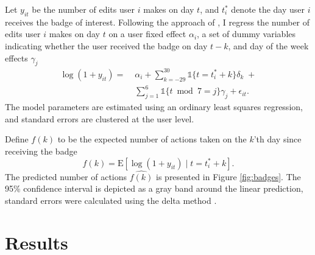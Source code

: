 \documentclass[conference]{IEEEtran}
\newcommand{\1}{\mathds{1}}
\newcommand{\E}{\mathrm{E}}
\begin{document}
Let $y_{it}$ be the number of edits user $i$ makes on day $t$, and $t_i^*$ denote the day user $i$ receives the badge of interest. Following the approach of \citet{Jacobson1993}, I regress the number of edits user $i$ makes on day $t$ on a user fixed effect $\alpha_i$, a set of dummy variables indicating whether the user received the badge on day $t-k$, and day of the week effects $\gamma_j$
\begin{equation}
\begin{split}
\log(1 + y_{it}) = \; & \alpha_i + \sum_{k=-29}^{30} \1 \{ t = t_i^* + k \} \delta_k \; + \\
  & \sum_{j=1}^6 \1 \{ t \bmod 7 = j \} \gamma_j + \epsilon_{it}.
\end{split}
\end{equation}
The model parameters are estimated using an ordinary least squares regression, and standard errors are clustered at the user level.

Define $f(k)$ to be the expected number of actions taken on the $k$'th day since receiving the badge
\begin{equation}
f(k) = \E \left[ \log(1 + y_{it}) \; | \; t=t^*_i + k \right].
\end{equation}
The predicted number of actions $\hat{f(k)}$ is presented in Figure \ref{fig:badges}. The 95\% confidence interval is depicted as a gray band around the linear prediction, standard errors were calculated using the delta method \citep{Williams2012}.

\section{Results}
\end{document}
